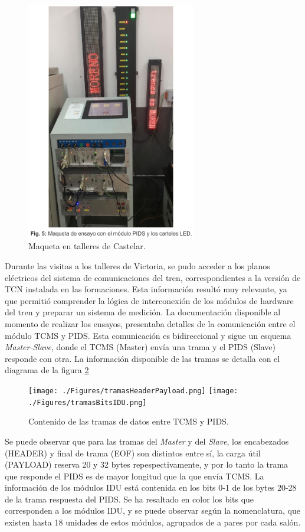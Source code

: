\begin{figure}[H]
	\centering
	\includegraphics[width=0.66\textwidth]{./Figures/maqueta.png}
	\caption{Maqueta en talleres de Castelar.}
	\label{fig:maquetaCastelar}
\end{figure}


Durante las visitas a los talleres de Victoria, se pudo acceder a los planos eléctricos del sistema de comunicaciones del tren, correspondientes a la versión de TCN instalada en las formaciones. Esta información resultó muy relevante, ya que permitió comprender la lógica de interconexión de los módulos de hardware del tren y preparar un sistema de medición. La documentación disponible al momento de realizar los ensayos, presentaba detalles de la comunicación entre el módulo TCMS y PIDS. Esta comunicación es bidireccional y sigue un esquema \textit{Master-Slave}, donde el TCMS (Master) envía una trama y el PIDS (Slave) responde con otra. La información disponible de las tramas se detalla con el diagrama de la figura \ref{fig:tramasHeaderPayload}

\begin{figure}[H]
	\centering
	\texttt{[image: ./Figures/tramasHeaderPayload.png]}
	\texttt{[image: ./Figures/tramasBitsIDU.png]}
	\caption{Contenido de las tramas de datos entre TCMS y PIDS.}
	\label{fig:tramasHeaderPayload}
\end{figure}

Se puede observar que para las tramas del \textit{Master} y del \textit{Slave}, los encabezados (HEADER) y final de trama (EOF) son distintos entre sí, la carga útil (PAYLOAD) reserva 20 y 32 bytes repespectivamente, y por lo tanto la trama que responde el PIDS es de mayor longitud que la que envía TCMS. La información de los módulos IDU está contenida en los bits 0-1 de los bytes 20-28 de la trama respuesta del PIDS. Se ha resaltado en color los bits que corresponden a los módulos IDU, y se puede observar según la nomenclatura, que existen hasta 18 unidades de estos módulos, agrupados de a pares por cada salón. \\


